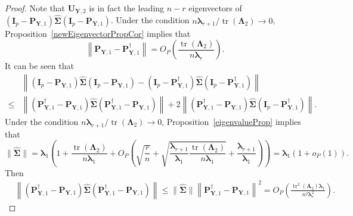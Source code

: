 \documentclass[12pt]{article} %
\DeclareMathOperator{\mytr}{tr}
\newcommand{\bP}{\mathbf{P}}
\newcommand{\bY}{\mathbf{Y}}
\newcommand{\bI}{\mathbf{I}}
\newcommand{\bU}{\mathbf{U}}
\newcommand{\bfsym}[1]{\ensuremath{\boldsymbol{#1}}}
\def\blambda {\bfsym {\lambda}}
\def\bLambda {\bfsym {\Lambda}}
\def\bSigma {\bfsym {\Sigma}}
\theoremstyle{definition}
\begin{document}
\begin{appendices}
\begin{proof}
    Note that $\bU_{\bY,2}$ is in fact the leading $n-r$ eigenvectors of $(\bI_p -\bP_{\bY,1})\hat{\bSigma}(\bI_p -\bP_{\bY,1})$.
    Under the condition $n\blambda_{r+1}/\mytr(\bLambda_2)\to 0$,
    Proposition~\ref{newEigenvectorPropCor} implies that 
    \begin{equation*}
        \left\|
        \bP_{\bY,1}
        - 
\bP^\dagger_{\bY,1}
        \right\|
    =O_P\left(\frac{\mytr(\bLambda_2)}{n\blambda_r}\right).
    \end{equation*}
    It can be seen that
    \begin{equation*}
        \begin{split}
             &
             \left\|(\bI_p -\bP_{\bY,1})\hat{\bSigma}(\bI_p -\bP_{\bY,1})
             -
             (\bI_p -\bP^\dagger_{\bY,1})\hat{\bSigma}(\bI_p-\bP^\dagger_{\bY,1})
             \right\|
             \\
             \leq&
             \left\|
             (\bP^\dagger_{\bY,1}-\bP_{\bY,1})\hat{\bSigma}(\bP^\dagger_{\bY,1}-\bP_{\bY,1})
             \right\|
             +
             2\left\|
             (\bP^\dagger_{\bY,1}-\bP_{\bY,1})\hat{\bSigma}(\bI_p-\bP^\dagger_{\bY,1})
             \right\|
             .
        \end{split}
    \end{equation*}
    Under the condition $n\blambda_{r+1}/\mytr(\bLambda_2)\to 0$, Proposition~\ref{eigenvalueProp} implies that
    \begin{equation*}
        \|\hat{\bSigma}\|
        =\blambda_1\left(
            1+\frac{\mytr(\bLambda_2)}{n\blambda_1}+O_P\left(\sqrt{\frac{r}{n}}+\sqrt{\frac{\blambda_{r+1}}{\blambda_1}\frac{\mytr(\bLambda_2)}{n\blambda_1}}+\frac{\blambda_{r+1}}{\blambda_1}\right)
        \right)
        =\blambda_1(1+o_P(1)).
    \end{equation*}
     Then
     \begin{equation}\label{aiBound1}
        \begin{split}
             &\left\|
             (\bP^\dagger_{\bY,1}-\bP_{\bY,1})\hat{\bSigma}(\bP^\dagger_{\bY,1}-\bP_{\bY,1})
             \right\|
             \leq
             \|\hat{\bSigma}\|
             \left\|
             \bP^\dagger_{\bY,1}-\bP_{\bY,1}
             \right\|^2
                 =
            O_P
                \left(
                    \frac{\mytr^2(\bLambda_2)\blambda_1}{n^2 \blambda_r^2}
                \right).
        \end{split}
    \end{equation}

\end{proof}
\end{appendices}
\end{document}
